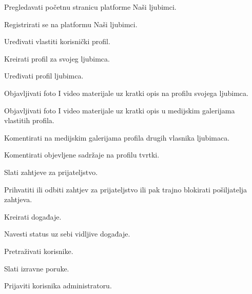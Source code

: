 			
			\begin{packed_enum}
				\item  {}
				
				\begin{packed_enum}
					
					\item Pregledavati početnu stranicu platforme Naši ljubimci.
					\item Registrirati se na platformu Naši ljubimci.
					
				\end{packed_enum}
			
				\item  {}
				
				\begin{packed_enum}
					
					\item Uređivati vlastiti korisnički profil.
					\item Kreirati profil za svojeg ljubimca.
					\item Uređivati profil ljubimca.
					\item Objavljivati foto I video materijale uz kratki opis na profilu svojega ljubimca.
					\item Objavljivati foto I video materijale uz kratki opis u medijskim galerijama vlastitih profila.
					\item Komentirati na medijskim galerijama profila drugih vlasnika ljubimaca.
					\item Komentirati objevljene sadržaje na profilu tvrtki.
					\item Slati zahtjeve za prijateljstvo.
					\item Prihvatiti ili odbiti zahtjev za prijateljstvo ili pak trajno blokirati pošiljatelja zahtjeva. 
					\item Kreirati događaje.
					\item Navesti status uz sebi vidljive događaje.
					\item Pretraživati korisnike.
					\item Slati izravne poruke.
					\item Prijaviti korisnika administratoru.
					
				\end{packed_enum}
			
				\item  {}
				

\end{packed_enum}
